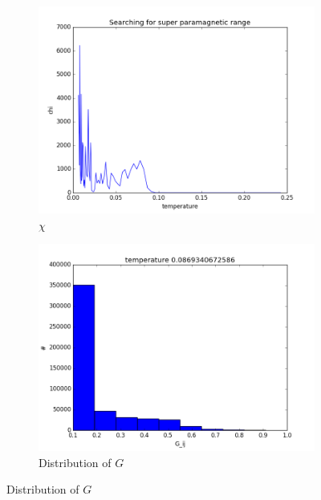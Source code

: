 \documentclass{beamer}
\begin{document}
\begin{frame}[fragile]
\begin{figure}
\begin{subfigure}{0.45\textwidth}
  \includegraphics[width=.8\linewidth]{fig/suspencability.png}
  \caption{$\chi$}%
  \label{fig:suspenc}
\end{subfigure}
\hspace*{\fill}
\begin{subfigure}{0.45\textwidth}
  \centering
  \includegraphics[width=.8\linewidth]{fig/temp__.png}
  \caption{Distribution of $G$}
  \label{fig:gij}
\end{subfigure}
\end{figure}

\end{frame}
\end{document}
